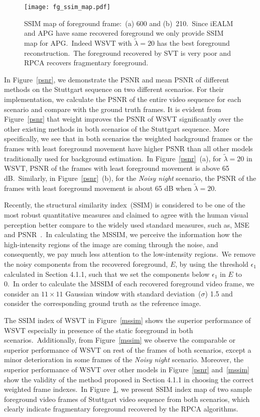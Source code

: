 \documentclass[twoside,11pt]{article}
\begin{document}
\begin{figure}[H]
	\texttt{[image: fg\_ssim\_map.pdf]}
	\caption{SSIM map of foreground frame:~(a) 600 and (b)~210.~Since iEALM and APG have same recovered foreground we only provide SSIM map for APG.~Indeed WSVT with $\tilde{\lambda}=20$ has the best foreground reconstruction.~The foreground recovered by SVT is very poor and RPCA recovers fragmentary foreground.}\label{ssim_map}
\end{figure}

In Figure~\ref{psnr}, we demonstrate the PSNR and mean PSNR of different methods on the Stuttgart sequence on two different scenarios. For their implementation, we calculate the PSNR of the entire video sequence for each scenario and compare with the ground truth frames. It is evident from Figure~\ref{psnr} that weight improves the PSNR of WSVT significantly over the other existing methods in both scenarios of the Stuttgart sequence. More specifically, we see that in both scenarios the weighted background frames or the frames with least foreground movement have higher PSNR than all other models traditionally used for background estimation.~In Figure~\ref{psnr}~(a), for $\tilde{\lambda}=20$ in WSVT, PSNR of the frames with least foreground movement is above 65 dB.~Similarly, in Figure~\ref{psnr}~(b), for the {\it Noisy night} scenario, the PSNR of the frames with least foreground movement is about 65 dB when $\tilde{\lambda}=20$.

Recently, the structural similarity index~(SSIM) is considered to be one of the most robust quantitative measures and claimed to agree with the human visual perception better compare to the widely used standard measures, such as, MSE and PSNR~\citep{mssim}.~In calculating the MSSIM, we perceive the information how the high-intensity regions of the image are coming through the noise, and consequently, we pay much less attention to the low-intensity regions.~We remove the noisy components from the recovered foreground, $E$, by using the threshold $\epsilon_1$ calculated in Section 4.1.1, such that we set the components below $\epsilon_1$ in $E$ to 0.~In order to calculate the MSSIM of each recovered foreground video frame, we consider an $11\times 11$ Gaussian window with standard deviation~($\sigma$) 1.5 and consider the corresponding ground truth as the reference image. 

The SSIM index of WSVT in Figure~\ref{mssim} shows the superior performance of WSVT especially in presence of the static foreground in both scenarios.~Additionally, from Figure~\ref{mssim} we observe the comparable or superior performance of WSVT on rest of the frames of both scenarios, except a minor deterioration in some frames of the {\it Noisy night} scenario. Moreover, the superior performance of WSVT over other models in Figure~\ref{psnr} and~\ref{mssim} show the validity of the method proposed in Section 4.1.1 in choosing the correct weighted frame indexes.~In Figure~\ref{ssim_map}, we present SSIM index map of two sample foreground video frames of Stuttgart video sequence from both scenarios, which clearly indicate fragmentary foreground recovered by the RPCA algorithms.  
\end{document}
